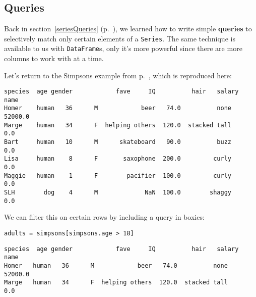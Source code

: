 
\chapter[Tables in Python (3 of 3)]{\huge\selectfont{Tables in Python (3 of
3)}}

\section{Queries}

\label{queries}

Back in section~\ref{seriesQueries} (p.~\pageref{seriesQueries}), we learned
how to write simple \textbf{queries} to selectively match only certain elements
of a \texttt{Series}. The same technique is available to us with
\texttt{DataFrame}s, only it's more powerful since there are more columns to
work with at a time.


Let's return to the Simpsons example from p.~\pageref{finalSimpsons}, which is
reproduced here:

\begin{Verbatim}[fontsize=\footnotesize,samepage=true,frame=leftline,framesep=5mm,framerule=1mm]
       species  age gender            fave     IQ          hair   salary
name                                                                    
Homer    human   36      M            beer   74.0          none  52000.0
Marge    human   34      F  helping others  120.0  stacked tall      0.0
Bart     human   10      M      skateboard   90.0          buzz      0.0
Lisa     human    8      F       saxophone  200.0         curly      0.0
Maggie   human    1      F        pacifier  100.0         curly      0.0
SLH        dog    4      M             NaN  100.0        shaggy      0.0
\end{Verbatim}


We can filter this on certain rows by including a query in boxies:


\begin{Verbatim}[fontsize=\normalsize,samepage=true,frame=single,framesep=3mm]
adults = simpsons[simpsons.age > 18]
\end{Verbatim}
\vspace{-.2in}

\begin{Verbatim}[fontsize=\small,samepage=true,frame=leftline,framesep=5mm,framerule=1mm]
      species  age gender            fave     IQ          hair   salary
name                                                                   
Homer   human   36      M            beer   74.0          none  52000.0
Marge   human   34      F  helping others  120.0  stacked tall      0.0
\end{Verbatim}

